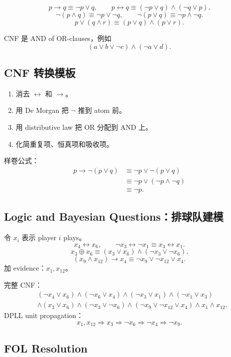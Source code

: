 \documentclass[UTF8,11pt,a4paper]{ctexart}
\begin{document}
\[
p\to q\equiv \neg p\lor q,\qquad
p\leftrightarrow q\equiv(\neg p\lor q)\land(\neg q\lor p).
\]
\[
\neg(p\land q)\equiv \neg p\lor\neg q,\qquad
\neg(p\lor q)\equiv \neg p\land\neg q.
\]
\[
p\lor(q\land r)\equiv(p\lor q)\land(p\lor r).
\]

CNF 是 AND of OR-clauses，例如
\[
(a\lor b\lor\neg c)\land(\neg a\lor d).
\]

\subsection{CNF 转换模板}

\begin{enumerate}
\item 消去 $\leftrightarrow$ 和 $\to$。
\item 用 De Morgan 把 $\neg$ 推到 atom 前。
\item 用 distributive law 把 OR 分配到 AND 上。
\item 化简重复项、恒真项和吸收项。
\end{enumerate}

样卷公式：
\[
\begin{aligned}
p\to \neg(p\lor q)
&\equiv \neg p\lor \neg(p\lor q)\\
&\equiv \neg p\lor(\neg p\land\neg q)\\
&\equiv \neg p.
\end{aligned}
\]

\subsection{Logic and Bayesian Questions：排球队建模}

令 $x_i$ 表示 player $i$ plays。
\[
x_4\leftrightarrow x_6,\qquad
\neg x_3\leftrightarrow \neg x_1 \equiv x_3\leftrightarrow x_1.
\]
\[
x_3\oplus x_6\equiv(x_3\lor x_6)\land(\neg x_3\lor\neg x_6).
\]
\[
(x_9\land x_{12})\to x_4\equiv
\neg x_9\lor\neg x_{12}\lor x_4.
\]
加 evidence：$x_1,x_{12}$。

完整 CNF：
\[
\begin{aligned}
&(\neg x_4\lor x_6)\land(\neg x_6\lor x_4)
\land(\neg x_3\lor x_1)\land(\neg x_1\lor x_3)\\
&\land(x_3\lor x_6)\land(\neg x_3\lor\neg x_6)
\land(\neg x_9\lor\neg x_{12}\lor x_4)
\land x_1\land x_{12}.
\end{aligned}
\]
DPLL unit propagation：
\[
x_1,x_{12}\Rightarrow x_3\Rightarrow \neg x_6\Rightarrow \neg x_4\Rightarrow \neg x_9.
\]

\subsection{FOL Resolution}
\end{document}
